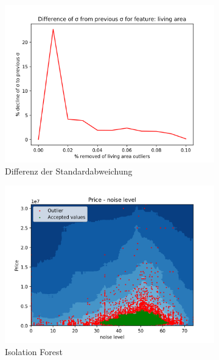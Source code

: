 \begin{figure}[h]
\begin{subfigure}{.5\textwidth}
  \centering
  \includegraphics[width=\linewidth]{images/anhang/outlier_detection/living_area_diff_of_std.png}
  \caption{Differenz der Standardabweichung}
\end{subfigure}
\begin{subfigure}{.5\textwidth}
  \centering
  \includegraphics[width=\linewidth]{images/anhang/outlier_detection/noise_level_IsolationForest.png}
  \caption{Isolation Forest}
\end{subfigure}
\begin{subfigure}{.5\textwidth}
\centering

\end{subfigure}
\end{figure}
